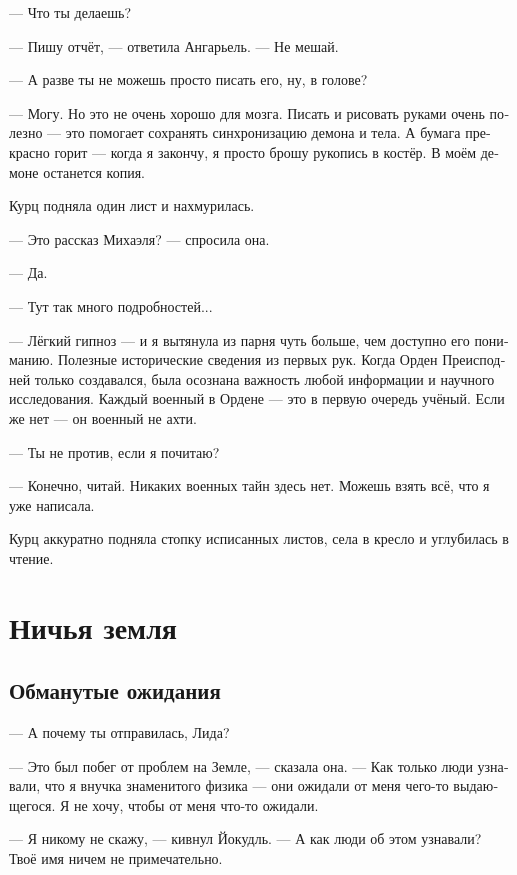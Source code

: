 \documentclass[a4paper,12pt,fleqn]{book}\usepackage{polyglossia}\setdefaultlanguage[babelshorthands=true]{russian}\setotherlanguage{english}\defaultfontfeatures{Ligatures=TeX,Mapping=tex-text}\usepackage{xcolor}\newcommand{\ml}[3]{#2}
\begin{document}
--- Что ты делаешь?

--- Пишу отчёт, --- ответила Ангарьель.
--- Не мешай.

--- А разве ты не можешь просто писать его, ну, в голове?

--- Могу.
Но это не очень хорошо для мозга.
Писать и рисовать руками очень полезно --- это помогает сохранять синхронизацию демона и тела.
А бумага прекрасно горит --- когда я закончу, я просто брошу рукопись в костёр.
В моём демоне останется копия.

Курц подняла один лист и нахмурилась.

--- Это рассказ Михаэля? --- спросила она.

--- Да.

--- Тут так много подробностей...

--- Лёгкий гипноз --- и я вытянула из парня чуть больше, чем доступно его пониманию.
Полезные исторические сведения из первых рук.
Когда Орден Преисподней только создавался, была осознана важность любой информации и научного исследования.
\ml{$0$}
{Каждый военный в Ордене --- это в первую очередь учёный.}
{Every military in the Order is a scientist in the first place.}
\ml{$0$}
{Если же нет --- он военный не ахти.}
{Otherwise, they're not much of a military.''}

\ml{$0$}
{--- Ты не против, если я почитаю?}
{``Would you mind if I read?''}

--- Конечно, читай.
Никаких военных тайн здесь нет.
Можешь взять всё, что я уже написала.

Курц аккуратно подняла стопку исписанных листов, села в кресло и углубилась в чтение.

\chapter{Ничья земля}

\section{Обманутые ожидания}

--- А почему ты отправилась, Лида?

--- Это был побег от проблем на Земле, --- сказала она.
--- Как только люди узнавали, что я внучка знаменитого физика --- они ожидали от меня чего-то выдающегося.
Я не хочу, чтобы от меня что-то ожидали.

--- Я никому не скажу, --- кивнул Йокудль.
--- А как люди об этом узнавали?
Твоё имя ничем не примечательно.
\end{document}
